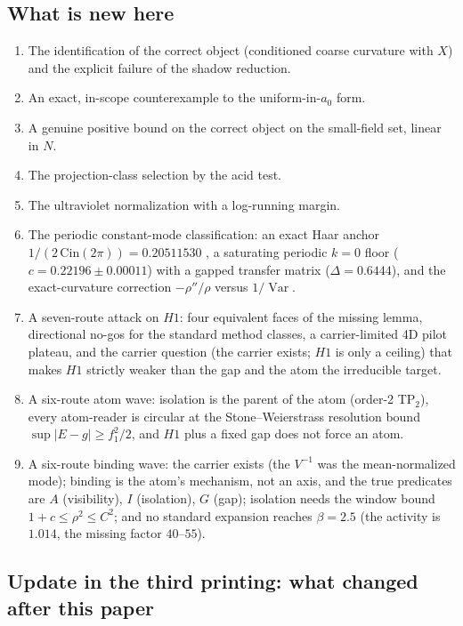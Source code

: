 \documentclass[11pt,a4paper]{article}
\newcommand{\labb}[2]{\fcolorbox{#1!35}{#1!8}{\textcolor{#1}{\textbf{\scriptsize #2}}}}
\newcommand{\LT}{\labb{cT}{T}}
\begin{document}
\subsection{What is new here}

\begin{enumerate}
\item The identification of the correct object (conditioned coarse curvature with $X$) and the
  explicit failure of the shadow reduction.
\item An exact, in-scope counterexample to the uniform-in-$a_0$ form.
\item A genuine positive bound on the correct object on the small-field set, linear in $N$.
\item The projection-class selection by the acid test.
\item The ultraviolet normalization with a log-running margin.
\item The periodic constant-mode classification: an exact Haar anchor
  $1/(2\,\mathrm{Cin}(2\pi))=0.20511530$ \LT, a saturating periodic $k=0$ floor
  ($c=0.22196\pm0.00011$) with a gapped transfer matrix ($\Delta=0.6444$), and the exact-curvature
  correction $-\rho''/\rho$ versus $1/\operatorname{Var}$.
\item A seven-route attack on $H1$: four equivalent faces of the missing lemma, directional
  no-gos for the standard method classes, a carrier-limited 4D pilot plateau, and the carrier
  question (the carrier exists; $H1$ is only a ceiling) that makes $H1$ strictly weaker than the gap
  and the atom the irreducible target.
\item A six-route atom wave: isolation is the parent of the atom (order-2 TP$_2$), every atom-reader
  is circular at the Stone--Weierstrass resolution bound $\sup|E-g|\ge f_1^2/2$, and $H1$ plus a
  fixed gap does not force an atom.
\item A six-route binding wave: the carrier exists (the $V^{-1}$ was the mean-normalized mode);
  binding is the atom's mechanism, not an axis, and the true predicates are $A$ (visibility), $I$
  (isolation), $G$ (gap); isolation needs the window bound $1+c\le\rho^2\le C^2$; and no standard
  expansion reaches $\beta=2.5$ (the activity is $1.014$, the missing factor $40$--$55$).
\end{enumerate}

\subsection{Update in the third printing: what changed after this paper}
\label{sec:update3}
\end{document}
